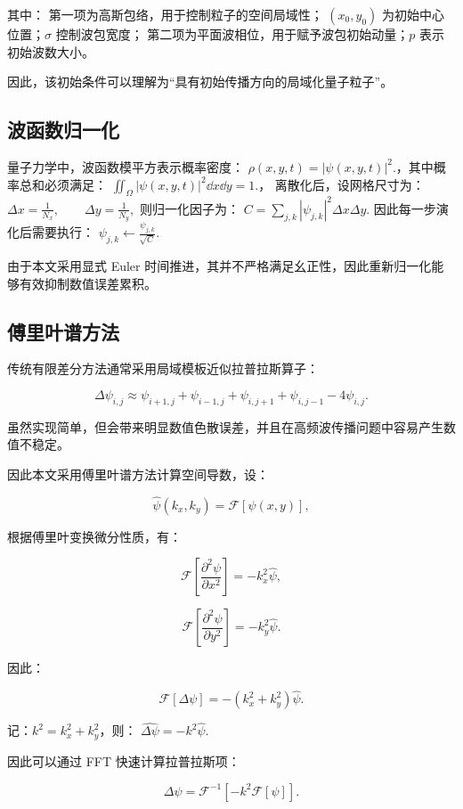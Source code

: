 \documentclass[UTF8,a4paper,12pt]{ctexart}
\begin{document}
其中：
第一项为高斯包络，用于控制粒子的空间局域性；
$(x_0,y_0)$ 为初始中心位置；$\sigma$ 控制波包宽度；
第二项为平面波相位，用于赋予波包初始动量；$p$ 表示初始波数大小。

因此，该初始条件可以理解为“具有初始传播方向的局域化量子粒子”。

\subsection{波函数归一化}

量子力学中，波函数模平方表示概率密度： $\rho(x,y,t)=|\psi(x,y,t)|^2.$，其中概率总和必须满足： $\iint_\Omega |\psi(x,y,t)|^2 \dd x \dd y = 1.$，
离散化后，设网格尺寸为：
$ \Delta x=\frac1{N_x},
\qquad
\Delta y=\frac1{N_y},
$ 则归一化因子为：
$
C
=
\sum_{j,k}
|\psi_{j,k}|^2
\Delta x\Delta y.
$
因此每一步演化后需要执行：
$
\psi_{j,k}
\leftarrow
\frac{\psi_{j,k}}{\sqrt{C}}.
$

由于本文采用显式 Euler 时间推进，其并不严格满足幺正性，因此重新归一化能够有效抑制数值误差累积。

\subsection{傅里叶谱方法}

传统有限差分方法通常采用局域模板近似拉普拉斯算子：

\[
\Delta \psi_{i,j}
\approx
\psi_{i+1,j}
+
\psi_{i-1,j}
+
\psi_{i,j+1}
+
\psi_{i,j-1}
-
4\psi_{i,j}.
\]

虽然实现简单，但会带来明显数值色散误差，并且在高频波传播问题中容易产生数值不稳定。

因此本文采用傅里叶谱方法计算空间导数，设：

\[
\hat\psi(k_x,k_y)
=
\mathcal{F}[\psi(x,y)],
\]

根据傅里叶变换微分性质，有：

\[
\mathcal{F}
\left[
\frac{\partial^2\psi}{\partial x^2}
\right]
=
-k_x^2\hat\psi,
\]

\[
\mathcal{F}
\left[
\frac{\partial^2\psi}{\partial y^2}
\right]
=
-k_y^2\hat\psi.
\]

因此：

\[
\mathcal{F}[\Delta\psi]
=
-(k_x^2+k_y^2)\hat\psi.
\]

记：$k^2=k_x^2+k_y^2$，则：
$
\widehat{\Delta\psi}
=
-k^2\hat\psi.
$

因此可以通过 FFT 快速计算拉普拉斯项：

\[
\Delta\psi
=
\mathcal{F}^{-1}
\left[
-k^2\mathcal{F}[\psi]
\right].
\]
\end{document}
